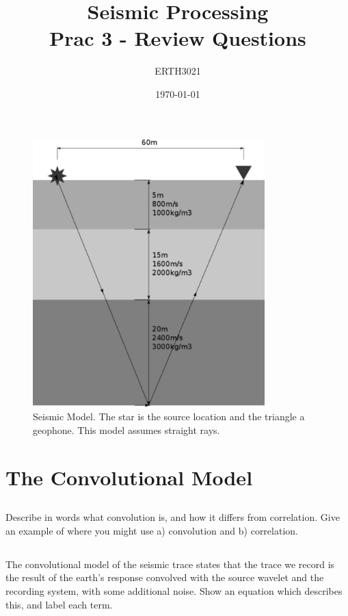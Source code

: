 \documentclass[a4paper, 10pt]{article}
\title{Seismic Processing \\ Prac 3 - Review Questions} %
\author{ERTH3021} %
\date{\today} %
\begin{document}
\maketitle %

\begin{figure}[h]
\centering
\includegraphics[width=0.8\textwidth]{model.pdf}
\caption{Seismic Model. The star is the source location and the triangle a geophone. This model assumes straight rays.}
\end{figure}
\newpage
\section{The Convolutional Model}
\subsection{}
Describe in words what convolution is, and how it differs from correlation. Give an example of where you might use a) convolution and b) correlation.
\subsection{}
The convolutional model of the seismic trace states that the trace we record is the result of the earth's response convolved with the source wavelet and the recording system, with some additional noise. Show an equation which describes this, and label each term.
\end{document}
